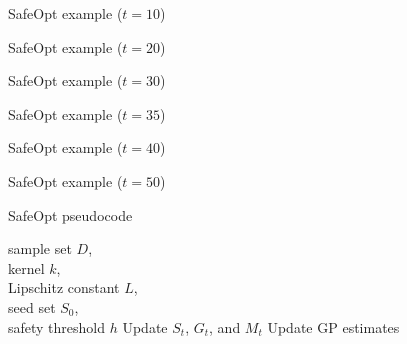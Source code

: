 \documentclass[xetex,10pt,mathserif,handout]{beamer}
\newlength\figureheight
\newlength\figurewidth
\newcommand{\cst}{{\color{cyan!70!black}$S_t$}\xspace}
\newcommand{\cgt}{{\color{lime!70!black}$G_t$}\xspace}
\newcommand{\ccgt}{{\color{lime!70!black}G_t}\xspace}
\newcommand{\cmt}{{\color{orange!70!black}$M_t$}\xspace}
\newcommand{\ccmt}{{\color{orange!70!black}M_t}\xspace}
\begin{document}
\begin{frame}{SafeOpt example ($t = 10$)}
  \centering
  \setlength\figurewidth{5in}
  \setlength\figureheight{3.5in}
  
\end{frame}

\begin{frame}{SafeOpt example ($t = 20$)}
  \centering
  \setlength\figurewidth{5in}
  \setlength\figureheight{3.5in}
  
\end{frame}

\begin{frame}{SafeOpt example ($t = 30$)}
  \centering
  \setlength\figurewidth{5in}
  \setlength\figureheight{3.5in}
  
\end{frame}

\begin{frame}{SafeOpt example ($t = 35$)}
  \centering
  \setlength\figurewidth{5in}
  \setlength\figureheight{3.5in}
  
\end{frame}

\begin{frame}{SafeOpt example ($t = 40$)}
  \centering
  \setlength\figurewidth{5in}
  \setlength\figureheight{3.5in}
  
\end{frame}

\begin{frame}{SafeOpt example ($t = 50$)}
  \centering
  \setlength\figurewidth{5in}
  \setlength\figureheight{3.5in}
  
\end{frame}


\begin{frame}{SafeOpt pseudocode}
\begin{algorithmic}
  \REQUIRE sample set $D$,\\
           \hspace{2.1em}kernel $k$,\\
           \hspace{2.1em}Lipschitz constant $L$,\\
           \hspace{2.1em}seed set $S_0$,\\
           \hspace{2.1em}safety threshold $h$
  \STATE
    \STATE Update \cst, \cgt, and \cmt
    \LET{$x_t$}{$\argmax_{x \in \ccgt \cup \ccmt}(u_t(x) - \ell_t(x))$}
    \STATE Update GP estimates
  \ENDFOR
\end{algorithmic}
\end{frame}
\end{document}
